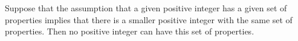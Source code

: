 Suppose that the assumption that a given positive integer has a given set of properties implies that there is a smaller positive integer with the same set of properties. Then no positive integer can have this set of properties.
